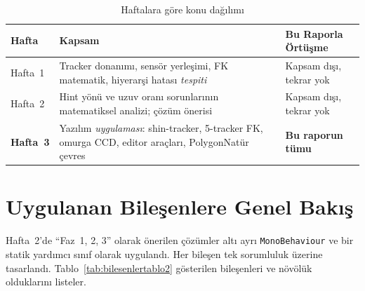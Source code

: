 \documentclass[11pt,a4paper]{article}
\begin{document}
\begin{table}[H]
\centering
\caption{Haftalara g\"ore konu da\u{g}{\i}l{\i}m{\i}}
\label{tab:kapsam}
\renewcommand{\arraystretch}{1.25}
\begin{tabularx}{\textwidth}{lXX}
\toprule
\textbf{Hafta} & \textbf{Kapsam} & \textbf{Bu Raporla \"{O}rt\"u\c{s}me} \\
\midrule
Hafta~1 & Tracker donan{\i}m{\i}, sens\"or yerle\c{s}imi, FK matematik, hiyerar\c{s}i hatas{\i} \textit{tespiti} & Kapsam d{\i}\c{s}{\i}, tekrar yok \\
Hafta~2 & Hint y\"on\"u ve uzuv oran{\i} sorunlar{\i}n{\i}n matematiksel analizi; \c{c}\"oz\"um \"{o}nerisi & Kapsam d{\i}\c{s}{\i}, tekrar yok \\
\textbf{Hafta~3} & Yaz{\i}l{\i}m \textit{uygulamas{\i}}: shin-tracker, 5-tracker FK, omurga CCD, editor araçlar{\i}, PolygonNat\"ur çevres & \textbf{Bu raporun t\"umu} \\
\bottomrule
\end{tabularx}
\end{table}

\section{Uygulanan Bile\c{s}enlere Genel Bak{\i}\c{s}}
\label{sec:bilesenlertablo}

Hafta~2'de ``Faz~1, 2, 3'' olarak \"{o}nerilen \c{c}\"oz\"umler
alt{\i} ayr{\i} \texttt{MonoBehaviour} ve bir statik yard{\i}mc{\i}
s{\i}n{\i}f olarak uyguland{\i}. Her bile\c{s}en tek sorumluluk
\"uzerine tasarland{\i}. Tablo~\ref{tab:bilesenlertablo2} g\"osterilen
bile\c{s}enleri ve n\"ov\"{o}lük olduklar{\i}n{\i} listeler.
\end{document}
